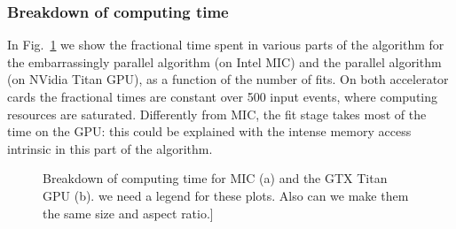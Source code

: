 \documentclass[letterpaper]{jpconf}
\providecommand{\fixme}[1]{\xspace{\sffamily{[\bfseries{}FIXME:} #1]}}
\begin{document}
\subsubsection{Breakdown of computing time}
In Fig.~\ref{fig:breakdown} we show the fractional time spent in
various parts of the algorithm for the embarrassingly parallel algorithm 
(on Intel MIC) and the parallel algorithm (on NVidia Titan GPU), as a 
function of the number of fits. On both accelerator cards the fractional times
are constant over 500 input events, where computing resources are saturated. 
Differently from MIC, the fit stage takes most of the time on the GPU: this 
could be explained with the intense memory access intrinsic in 
this part of the algorithm.  
\begin{figure}[tbp]
\centering
{}
\caption{Breakdown of computing time for MIC (a) and the GTX Titan GPU
  (b). \fixme{we need a legend for these plots. Also can we make them
    the same size and aspect ratio.}}
\label{fig:breakdown}
\end{figure}
\end{document}
